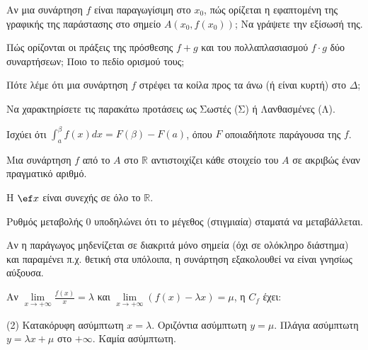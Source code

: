 \documentclass[11pt,a4paper]{article}
\newcommand{\kerkissans}[1]{{\fontfamily{maksf}\selectfont \textbf{#1}}}
\renewcommand{\textdexiakeraia}{}
\newcommand{\dint}{\displaystyle\int}
\newcommand\themanum{A}
\newcounter{thema}[section]
\renewcommand{\thethema}{\arabic{thema}}
\newcommand{\Thema}{\refstepcounter{thema}{\textbf{\textcolor{black}{\faPenSquare\ \  \large \kerkissans{\textbf{\thethemaο\hspace{2mm}Διαγώνισμα - Θέμα \themanum}}}}}\hspace{0mm}}{}
\newenvironment{thema}[1]
{\begin{tcolorbox}[title=\Thema\kerkissans{\textbf{\large{  #1}}},breakable,
enhanced standard,titlerule=0pt,toprule=0pt, rightrule=0pt, bottomrule=0pt,
colback=white,left=0mm,top=1mm,bottom=0mm,
boxrule=0pt,
colframe=white,leftrule=0mm,sharp corners,coltitle=black]
\renewcommand{\themanum}{#1}}
{\end{tcolorbox}}
\begin{document}
\begin{thema}{A}
\begin{erwthma}
    \item Αν μια συνάρτηση $f$ είναι παραγωγίσιμη στο $x_0$, πώς ορίζεται η εφαπτομένη της γραφικής της παράστασης στο σημείο $A(x_0, f(x_0))$; Να γράψετε την εξίσωσή της.
    \item Πώς ορίζονται οι πράξεις της πρόσθεσης $f+g$ και του πολλαπλασιασμού $f \cdot g$ δύο συναρτήσεων; Ποιο το πεδίο ορισμού τους;
    \item Πότε λέμε ότι μια συνάρτηση $f$ στρέφει τα κοίλα προς τα άνω (ή είναι κυρτή) στο $\Delta$;
    \item Να χαρακτηρίσετε τις παρακάτω προτάσεις ως Σωστές (Σ) ή Λανθασμένες (Λ).
    \begin{alist}
        \item Ισχύει ότι $\dint_a^\beta f(x) dx = F(\beta) - F(a)$, όπου $F$ οποιαδήποτε παράγουσα της $f$.
        \item Μια συνάρτηση $f$ από το $A$ στο $\mathbb{R}$ αντιστοιχίζει κάθε στοιχείο του $A$ σε ακριβώς έναν πραγματικό αριθμό.
        \item H $\ef x$ είναι συνεχής σε όλο το $\mathbb{R}$.
        \item Ρυθμός μεταβολής 0 υποδηλώνει ότι το μέγεθος (στιγμιαία) σταματά να μεταβάλλεται.
        \item Αν η παράγωγος μηδενίζεται σε διακριτά μόνο σημεία (όχι σε ολόκληρο διάστημα) και παραμένει π.χ. θετική στα υπόλοιπα, η συνάρτηση εξακολουθεί να είναι γνησίως αύξουσα.
    \end{alist}
    \item Αν $\lim\limits_{x\to +\infty} \frac{f(x)}{x} = \lambda$ και $\lim\limits_{x\to +\infty} (f(x) - \lambda x) = \mu$, η $C_f$ έχει:
    \begin{tasks}[label=\let\textdexiakeraia\relax\alph*.](2)
        \task Κατακόρυφη ασύμπτωτη $x = \lambda$.
        \task Οριζόντια ασύμπτωτη $y = \mu$.
        \task Πλάγια ασύμπτωτη $y = \lambda x + \mu$ στο $+\infty$.
        \task Καμία ασύμπτωτη.
    \end{tasks}
\end{erwthma}
\end{thema}
\vspace{1cm}
\end{document}
